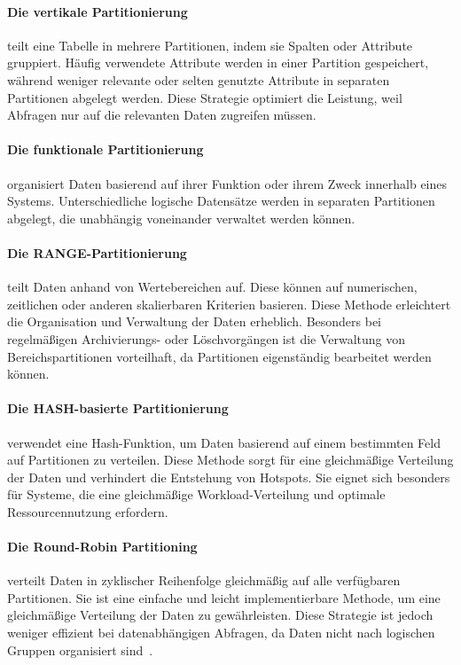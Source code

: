 \paragraph{Die vertikale Partitionierung} teilt eine Tabelle in mehrere Partitionen,
indem sie Spalten oder Attribute gruppiert.
Häufig verwendete Attribute werden in einer Partition gespeichert, während weniger relevante oder selten genutzte
Attribute in separaten Partitionen abgelegt werden.
Diese Strategie optimiert die Leistung, weil Abfragen nur auf die relevanten Daten zugreifen müssen.
\paragraph{Die funktionale Partitionierung} organisiert Daten basierend auf ihrer Funktion oder ihrem Zweck
innerhalb eines Systems.
Unterschiedliche logische Datensätze werden in separaten Partitionen abgelegt, die unabhängig voneinander verwaltet
werden können.
\paragraph{Die RANGE-Partitionierung} teilt Daten anhand von Wertebereichen auf.
Diese können auf numerischen, zeitlichen oder anderen skalierbaren Kriterien basieren.
Diese Methode erleichtert die Organisation und Verwaltung der Daten erheblich.
Besonders bei regelmäßigen Archivierungs- oder Löschvorgängen ist die Verwaltung von Bereichspartitionen vorteilhaft,
da Partitionen eigenständig bearbeitet werden können.
\paragraph{Die HASH-basierte Partitionierung} verwendet eine Hash-Funktion, um Daten basierend auf einem bestimmten
Feld auf Partitionen zu verteilen.
Diese Methode sorgt für eine gleichmäßige Verteilung der Daten und verhindert die Entstehung von Hotspots.
Sie eignet sich besonders für Systeme, die eine gleichmäßige Workload-Verteilung und optimale Ressourcennutzung erfordern.
\paragraph{Die Round-Robin Partitioning} verteilt Daten in zyklischer Reihenfolge gleichmäßig auf alle verfügbaren Partitionen.
Sie ist eine einfache und leicht implementierbare Methode, um eine gleichmäßige Verteilung der Daten zu gewährleisten.
Diese Strategie ist jedoch weniger effizient bei datenabhängigen Abfragen,
da Daten nicht nach logischen Gruppen organisiert sind~\cite{g4g-partitioning}.

